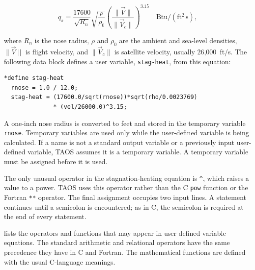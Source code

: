 \begin{equation}
  q_s = \frac{17600}{\sqrt{R_n}}
        \sqrt{\frac{\rho}{\rho_0}}
        \left(\frac{\lVert\vec V\rVert}{\lVert\vec V_c\rVert}\right)^{3.15}
        \quad \mathrm{Btu/(ft^2\,s)},
  \label{eq:stagnation-heating}
\end{equation}

where $R_n$ is the nose radius, $\rho$ and $\rho_0$ are the ambient and sea-level
densities, $\lVert\vec V\rVert$ is flight velocity, and
$\lVert\vec V_c\rVert$ is satellite velocity, usually 26,000~ft/s. The following data
block defines a user variable, \texttt{stag-heat}, from this equation:

\begin{lstlisting}[style=taosmanual]
*define stag-heat
  rnose = 1.0 / 12.0;
  stag-heat = (17600.0/sqrt(rnose))*sqrt(rho/0.0023769)
              * (vel/26000.0)^3.15;
\end{lstlisting}

A one-inch nose radius is converted to feet and stored in the temporary variable
\texttt{rnose}. Temporary variables are used only while the user-defined variable is
being calculated. If a name is not a standard output variable or a previously input
user-defined variable, TAOS assumes it is a temporary variable. A temporary
variable must be assigned before it is used.

The only unusual operator in the stagnation-heating equation is
\texttt{\textasciicircum}, which raises a value to a power. TAOS uses this operator
rather than the C \texttt{pow} function or the Fortran \texttt{**} operator. The final
assignment occupies two input lines. A statement continues until a semicolon is
encountered; as in C, the semicolon is required at the end of every statement.


 lists the operators and functions that may appear in
user-defined-variable equations. The standard arithmetic and relational operators
have the same precedence they have in C and Fortran. The mathematical functions
are defined with the usual C-language meanings.

